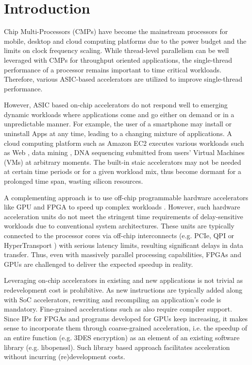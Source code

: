 
\section{Introduction}


Chip Multi-Processors (CMPs) have become the mainstream processors for
mobile, desktop and cloud computing platforms due to the power
budget and the limits on clock frequency scaling. While
thread-level parallelism can be well leveraged with CMPs \cite{CMP05}
for throughput oriented applications, the single-thread performance of
a processor remains important to time critical workloads. Therefore,
various ASIC-based accelerators are utilized to improve single-thread performance. 

However, ASIC based on-chip accelerators do not respond well to
emerging dynamic workloads where applications come and go either on
demand or in a unpredictable manner. For example, the user of a smartphone may
install or uninstall Apps at any time, leading to a changing mixture
of applications. A cloud computing platform such as Amazon EC2
\cite{amazon-ec2} executes various workloads such as Web
\cite{Chen:2012jo}, data mining \cite{ec2-datamining}, DNA sequencing
\cite{ec2-dna} submitted from users' Virtual Machines (VMs) at
arbitrary moments. The built-in staic accelerators may not be needed at certain time periods
or for a given workload mix, thus
become dormant for a prolonged time span, wasting silicon resources.

A complementing approach is to use off-chip programmable hardware
accelerators like GPU and FPGA to speed up complex workloads
\cite{GPUFPGA, fpga-acc}. However, such hardware acceleration units do
not meet the stringent time requirements of delay-sensitive workloads
due to conventional system architectures. These units are typically
connected to the processor cores via off-chip interconnects
(e.g. PCIe, QPI \cite{intel-qpi} or HyperTransport
\cite{amd-hypertransport}) with serious latency limits, resulting
significant delays in data transfer. Thus, even with massively
parallel processing capabilities, FPGAs and GPUs are challenged to
deliver the expected speedup in reality.  

Leveraging on-chip accelerators in existing and new applications is
not trivial as redevelopment cost is prohibitive.  
As new instructions are typically added along with SoC
accelerators, rewriting and recompiling an application's code is
mandatory. Fine-grained accelerations such as
\cite{Govindaraju:2012fn} also require compiler support. Since IPs for
FPGAs and programs developed for GPUs keep increasing, it makes sense
to incorporate them through coarse-grained acceleration, i.e. the
speedup of an entire function (e.g. 3DES encryption) as an element of
an existing software library (e.g. libopenssl). Such library based
approach facilitates acceleration without incurring (re)development
costs. 

